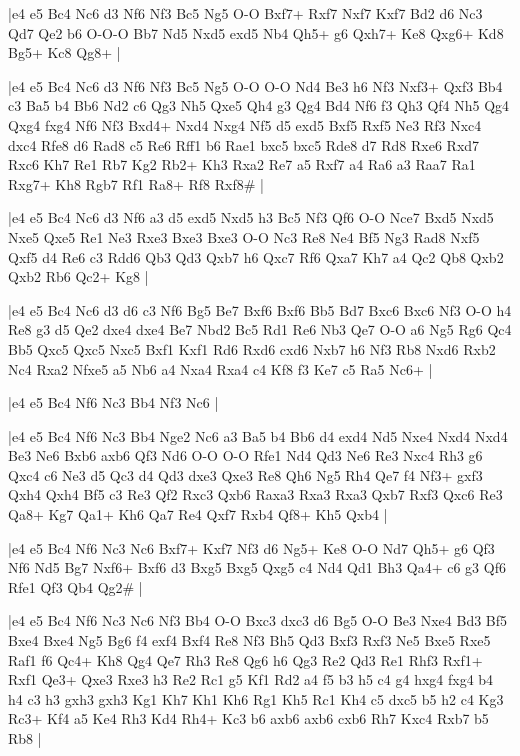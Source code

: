 \whitename{}
\blackname{}
\makegametitle
|e4 e5 Bc4 Nc6 d3 Nf6 Nf3 Bc5 Ng5 O-O Bxf7+ Rxf7 Nxf7 Kxf7 Bd2 d6 Nc3 Qd7 Qe2 b6 O-O-O Bb7 Nd5 Nxd5 exd5 Nb4 Qh5+ g6 Qxh7+ Ke8 Qxg6+ Kd8 Bg5+ Kc8 Qg8+  |

\whitename{}
\blackname{}
\makegametitle
|e4 e5 Bc4 Nc6 d3 Nf6 Nf3 Bc5 Ng5 O-O O-O Nd4 Be3 h6 Nf3 Nxf3+ Qxf3 Bb4 c3 Ba5 b4 Bb6 Nd2 c6 Qg3 Nh5 Qxe5 Qh4 g3 Qg4 Bd4 Nf6 f3 Qh3 Qf4 Nh5 Qg4 Qxg4 fxg4 Nf6 Nf3 Bxd4+ Nxd4 Nxg4 Nf5 d5 exd5 Bxf5 Rxf5 Ne3 Rf3 Nxc4 dxc4 Rfe8 d6 Rad8 c5 Re6 Rff1 b6 Rae1 bxc5 bxc5 Rde8 d7 Rd8 Rxe6 Rxd7 Rxc6 Kh7 Re1 Rb7 Kg2 Rb2+ Kh3 Rxa2 Re7 a5 Rxf7 a4 Ra6 a3 Raa7 Ra1 Rxg7+ Kh8 Rgb7 Rf1 Ra8+ Rf8 Rxf8\#  |

\whitename{}
\blackname{}
\makegametitle
|e4 e5 Bc4 Nc6 d3 Nf6 a3 d5 exd5 Nxd5 h3 Bc5 Nf3 Qf6 O-O Nce7 Bxd5 Nxd5 Nxe5 Qxe5 Re1 Ne3 Rxe3 Bxe3 Bxe3 O-O Nc3 Re8 Ne4 Bf5 Ng3 Rad8 Nxf5 Qxf5 d4 Re6 c3 Rdd6 Qb3 Qd3 Qxb7 h6 Qxc7 Rf6 Qxa7 Kh7 a4 Qc2 Qb8 Qxb2 Qxb2 Rb6 Qc2+ Kg8  |

\whitename{}
\blackname{}
\makegametitle
|e4 e5 Bc4 Nc6 d3 d6 c3 Nf6 Bg5 Be7 Bxf6 Bxf6 Bb5 Bd7 Bxc6 Bxc6 Nf3 O-O h4 Re8 g3 d5 Qe2 dxe4 dxe4 Be7 Nbd2 Bc5 Rd1 Re6 Nb3 Qe7 O-O a6 Ng5 Rg6 Qc4 Bb5 Qxc5 Qxc5 Nxc5 Bxf1 Kxf1 Rd6 Rxd6 cxd6 Nxb7 h6 Nf3 Rb8 Nxd6 Rxb2 Nc4 Rxa2 Nfxe5 a5 Nb6 a4 Nxa4 Rxa4 c4 Kf8 f3 Ke7 c5 Ra5 Nc6+  |

\whitename{}
\blackname{}
\makegametitle
|e4 e5 Bc4 Nf6 Nc3 Bb4 Nf3 Nc6  |

\whitename{}
\blackname{}
\makegametitle
|e4 e5 Bc4 Nf6 Nc3 Bb4 Nge2 Nc6 a3 Ba5 b4 Bb6 d4 exd4 Nd5 Nxe4 Nxd4 Nxd4 Be3 Ne6 Bxb6 axb6 Qf3 Nd6 O-O O-O Rfe1 Nd4 Qd3 Ne6 Re3 Nxc4 Rh3 g6 Qxc4 c6 Ne3 d5 Qc3 d4 Qd3 dxe3 Qxe3 Re8 Qh6 Ng5 Rh4 Qe7 f4 Nf3+ gxf3 Qxh4 Qxh4 Bf5 c3 Re3 Qf2 Rxc3 Qxb6 Raxa3 Rxa3 Rxa3 Qxb7 Rxf3 Qxc6 Re3 Qa8+ Kg7 Qa1+ Kh6 Qa7 Re4 Qxf7 Rxb4 Qf8+ Kh5 Qxb4  |

\whitename{}
\blackname{}
\makegametitle
|e4 e5 Bc4 Nf6 Nc3 Nc6 Bxf7+ Kxf7 Nf3 d6 Ng5+ Ke8 O-O Nd7 Qh5+ g6 Qf3 Nf6 Nd5 Bg7 Nxf6+ Bxf6 d3 Bxg5 Bxg5 Qxg5 c4 Nd4 Qd1 Bh3 Qa4+ c6 g3 Qf6 Rfe1 Qf3 Qb4 Qg2\#  |

\whitename{}
\blackname{}
\makegametitle
|e4 e5 Bc4 Nf6 Nc3 Nc6 Nf3 Bb4 O-O Bxc3 dxc3 d6 Bg5 O-O Be3 Nxe4 Bd3 Bf5 Bxe4 Bxe4 Ng5 Bg6 f4 exf4 Bxf4 Re8 Nf3 Bh5 Qd3 Bxf3 Rxf3 Ne5 Bxe5 Rxe5 Raf1 f6 Qc4+ Kh8 Qg4 Qe7 Rh3 Re8 Qg6 h6 Qg3 Re2 Qd3 Re1 Rhf3 Rxf1+ Rxf1 Qe3+ Qxe3 Rxe3 h3 Re2 Rc1 g5 Kf1 Rd2 a4 f5 b3 h5 c4 g4 hxg4 fxg4 b4 h4 c3 h3 gxh3 gxh3 Kg1 Kh7 Kh1 Kh6 Rg1 Kh5 Rc1 Kh4 c5 dxc5 b5 h2 c4 Kg3 Rc3+ Kf4 a5 Ke4 Rh3 Kd4 Rh4+ Kc3 b6 axb6 axb6 cxb6 Rh7 Kxc4 Rxb7 b5 Rb8  |

